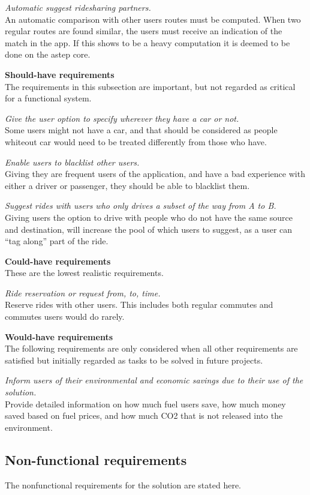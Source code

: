 \textit{Automatic suggest ridesharing partners.}\\
An automatic comparison with other users routes must be computed.
When two regular routes are found similar, the users must receive an indication of the match in the app.
If this shows to be a heavy computation it is deemed to be done on the \gls{astep} core.


\textbf{Should-have requirements}\\
The requirements in this subsection are important, but not regarded as critical for a functional system.

\textit{Give the user option to specify wherever they have a car or not.}\\
Some users might not have a car, and that should be considered as people whiteout car would need to be treated differently from those who have.

\textit{Enable users to blacklist other users.}\\
Giving they are frequent users of the application, and have a bad experience with either a driver or passenger, they should be able to blacklist them.

\textit{Suggest rides with users who only drives a subset of the way from A to B.}\\
Giving users the option to drive with people who do not have the same source and destination, will increase the pool of which users to suggest, as a user can ``tag along'' part of the ride.


\textbf{Could-have requirements}\\
These are the lowest realistic requirements. 

\textit{Ride reservation or request from, to, time.}\\
Reserve rides with other users. 
This includes both regular commutes and commutes users would do rarely.

\textbf{Would-have requirements}\\
The following requirements are only considered when all other requirements are satisfied but initially regarded as tasks to be solved in future projects.

\textit{Inform users of their environmental and economic savings due to their use of the solution.}\\
Provide detailed information on how much fuel users save, how much money saved based on fuel prices, and how much CO2 that is not released into the environment. 

\subsection{Non-functional requirements}
The nonfunctional requirements for the solution are stated here.

